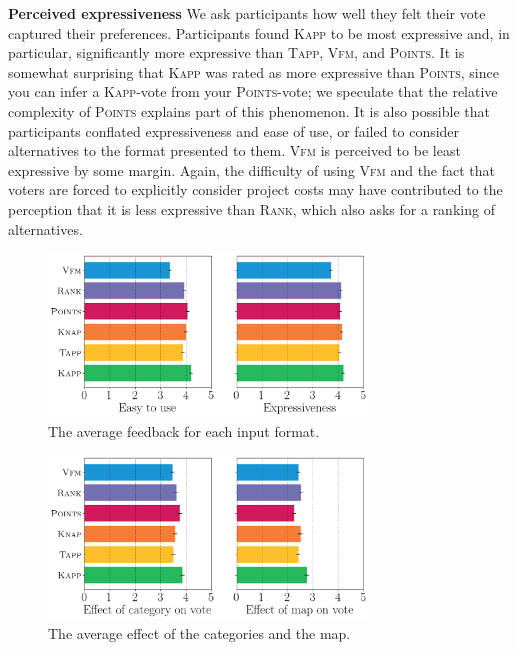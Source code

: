 \documentclass[mnsc,blindrev]{informs3_freeuse} %
\newcommand{\points}{\textsc{Points}}
\renewcommand{\rank}{\textsc{Rank}}
\newcommand{\vfm}{\textsc{Vfm}}
\newcommand{\kapp}{\textsc{Kapp}}
\newcommand{\tapp}{\textsc{Tapp}}
\begin{document}
\textbf{Perceived expressiveness} We ask  participants how well they felt their vote captured their preferences. 
Participants found \kapp{} to be most expressive and, in particular,  significantly more expressive than  \tapp, \vfm, and \points. It is somewhat surprising that \kapp{} was rated as more expressive than \points, since you can infer a \kapp-vote from  your \points-vote; we speculate that the relative complexity of  \points{} explains part of this phenomenon. It is also possible that participants conflated expressiveness and ease of use, or failed to consider alternatives to the format presented to them.
\vfm{} is perceived to be least expressive by some margin. Again, the  difficulty of using \vfm{} and the fact that voters are forced to explicitly consider project costs may have contributed to the perception that it is less expressive than \rank, which also asks for a ranking of alternatives.  


\begin{figure}[htb]
\begin{center}
\includegraphics[width=8.5cm]{../experiment/survey1.png}
\caption{The average feedback for each input format.
}\label{fig:feedback}
\end{center}\vspace{-3mm}
\end{figure}

\begin{figure}[htb]
\begin{center}
\includegraphics[width=8.5cm]{../experiment/survey2.png}
\caption{The average effect of the categories and the map.
}\label{fig:cat_map}
\end{center}\vspace{-5mm}
\end{figure}
\end{document}

